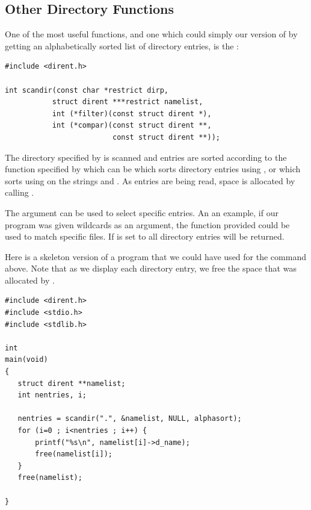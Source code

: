 
\subsection{Other Directory Functions}

One of the most useful functions, and one which could simply our version of  by getting an alphabetically sorted list of directory entries, is the :

\begin{lstlisting}
#include <dirent.h>

int scandir(const char *restrict dirp,
           struct dirent ***restrict namelist,
           int (*filter)(const struct dirent *), 
           int (*compar)(const struct dirent **, 
                         const struct dirent **));
\end{lstlisting}

\noindent
The directory specified by  is scanned and entries are sorted according to the function specified by  which can be  which sorts directory entries using , or  which sorts using  on the strings  and . As entries are being read, space is allocated by calling . 

The  argument can be used to select specific entries. An an example, if our  program was given wildcards as an argument, the  function provided could be used to match specific files. If  is set to  all directory entries will be returned. 

Here is a skeleton version of a program that we could have used for the  command above. Note that as we display each directory entry, we free the space that was allocated by .

\begin{lstlisting}
#include <dirent.h>
#include <stdio.h>
#include <stdlib.h>

int
main(void)
{
   struct dirent **namelist;
   int nentries, i;

   nentries = scandir(".", &namelist, NULL, alphasort);
   for (i=0 ; i<nentries ; i++) {
       printf("%s\n", namelist[i]->d_name);
       free(namelist[i]);
   }
   free(namelist);

}
\end{lstlisting}

